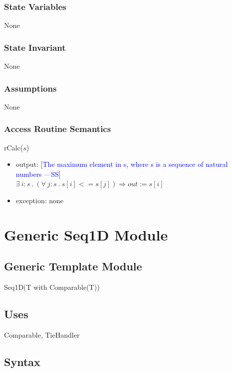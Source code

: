\documentclass[12pt,fleqn]{examtst}
\newcommand{\authornote}[3]{\textcolor{#1}{[#3 ---#2]}}
\newcommand{\authornote}[3]{}
\newcommand{\wss}[1]{\authornote{blue}{SS}{#1}}
\begin{document}
\subsubsection* {State Variables}

None

\subsubsection* {State Invariant}

None

\subsubsection* {Assumptions}

None

\subsubsection* {Access Routine Semantics}

rCalc($s$)
\begin{itemize}
\item output: \wss{The maximum element in s, where s is a sequence of natural
    numbers} \\
    $\exists \ i : s \ .\ (\forall \ j : s \ .\ s[i] <= s[j]) \Rightarrow out := s[i]$
\item exception: none
\end{itemize}


\newpage

\section* {Generic Seq1D Module}

\subsection* {Generic Template Module}

Seq1D(T with Comparable(T))

\subsection* {Uses}

Comparable, TieHandler

\subsection* {Syntax}
\end{document}
